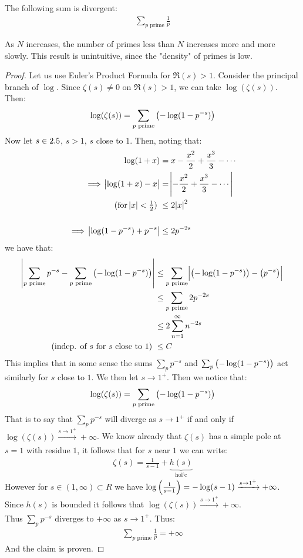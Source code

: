 \begin{corollary} The following sum is divergent:
\begin{align*}
    \sum_{p \text{ prime}} \frac{1}{p}
\end{align*}
\end{corollary}
\begin{note}
As $N$ increases, the number of primes less than $N$ increases more and more slowly. This result is unintuitive, since the "density" of primes is low.
\end{note}
\begin{proof}
Let us use Euler's Product Formula for $\Re(s) > 1$. Consider the principal branch of $\log$. Since $\zeta(s) \neq 0$ on $\Re(s) > 1$, we can take $\log(\zeta(s))$. Then:
\begin{align*}
    \log(\zeta(s)) = \sum_{p \text{ prime}} \left( - \log(1-p^{-s}) \right)
\end{align*}
Now let $s \in 2.5$, $s> 1$, $s$ close to $1$. Then, noting that:
\begin{align*}
\log(1+x) &= x - \frac{x^2}{2} + \frac{x^3}{3} - \cdots\\
\implies \abs{\log(1+x) - x} &= \abs{ - \frac{x^2}{2} + \frac{x^3}{3} - \cdots } \\
\text{(for $\abs{x} < \tfrac{1}{2}$) }&\leq 2 \abs{x}^2\\\\
\implies \abs{\log(1-p^{-s}) +p^{-s}} &\leq 2 p^{-2s}\\
\end{align*}
we have that:
\begin{align*}
    \abs{\sum_{p \text{ prime}} p^{-s} - \sum_{p \text{ prime}} \left( - \log(1-p^{-s}) \right) } &\leq \sum_{p \text{ prime}} \abs{\left( - \log(1-p^{-s}) \right) - \left( p^{-s} \right)}\\ &\leq  \sum_{p \text{ prime}} 2 p^{-2s}\\
    &\leq 2 \sum_{n=1}^\infty n^{-2s}\\
    \text{(indep. of $s$ for $s$ close to $1$) } & \leq C
\end{align*}
This implies that in some sense the sums $\sum_p p^{-s}$ and $\sum_p \left( - \log(1-p^{-s}) \right)$ act similarly for $s$ close to $1$. We then let $s \to 1^+$. Then we notice that:
\begin{align*}
    \log(\zeta(s)) = \sum_{p \text{ prime}} \left( - \log(1-p^{-s}) \right)
\end{align*}
That is to say that $\sum_p p^{-s}$ will diverge as $s \to 1^+$ if and only if $\log( \zeta(s)) \xrightarrow[]{s \to 1^+} + \infty$. We know already that $\zeta (s)$ has a simple pole at $s=1$ with residue $1$, it follows that for $s$ near $1$ we can write:
\begin{align*}
    \zeta(s) = \frac{1}{s-1} + \underbrace{h(s)}_{\text{hol'c}}
\end{align*}
However for $s \in (1,\infty) \subset 
R$ we have $\log\left( \frac{1}{s-1} \right) = - \log(s-1) \xrightarrow[]{s \to 1^+} +\infty$. Since $h(s)$ is bounded it follows that $\log( \zeta(s)) \xrightarrow[]{s \to 1^+} + \infty$.\\

Thus $\sum_p p^{-s}$ diverges to $+ \infty$ as $s \to 1^+$. Thus:
\begin{align*}
    \sum_{p \text{ prime}} \frac{1}{p} = + \infty
\end{align*}
And the claim is proven.
\end{proof}


